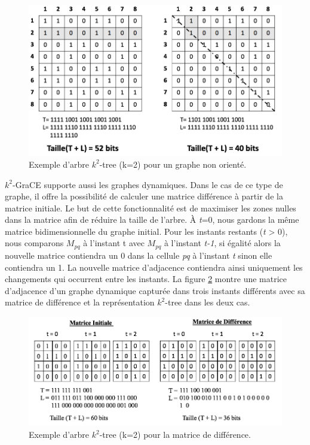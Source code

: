 \documentclass[a4paper,oneside,12pt]{report}
\theoremstyle{definition}
\begin{document}
\begin{figure}[H]
\centering
	\includegraphics[scale=0.4]{./ressources/image/k2_non.png}
	\caption[Exemple d'arbre $k^2$-tree (k=2) pour un graphe non orienté.]{Exemple d'arbre $k^2$-tree (k=2) pour un graphe non orienté.}
	\label{k2_non}
\end{figure}	


	
	$k^2$-GraCE supporte aussi les graphes dynamiques. Dans le cas de ce type de graphe, il offre la possibilité de calculer une matrice différence à partir de la matrice initiale. Le but de cette fonctionnalité est de maximiser les zones nulles dans la matrice afin de réduire la taille de l'arbre. À \textit{t}=0, nous gardons la même matrice bidimensionnelle du graphe initial. Pour les instants restants (\textit{t} > 0), nous comparons $M_{pq}$ à l'instant t avec $M_{pq}$ à l'instant \textit{t-1}, si égalité alors la nouvelle matrice contiendra un 0 dans la cellule \textit{pq} à l'instant \textit{t} sinon elle contiendra un 1. La nouvelle matrice d'adjacence contiendra ainsi uniquement les changements qui occurrent entre les instants. La figure \ref{mat_diff} montre une matrice d'adjacence d'un graphe dynamique capturée dans trois instants différents avec sa matrice de différence et la représentation $k^2$-tree dans les deux cas.

\begin{figure}[H]
\centering
	\includegraphics[scale=0.48]{./ressources/image/dynk2diff.png}
	\caption[Exemple d'arbre $k^2$-tree (k=2) pour la matrice de différence]{Exemple d'arbre $k^2$-tree (k=2) pour la matrice de différence.}
	\label{mat_diff}
\end{figure}
\end{document}
